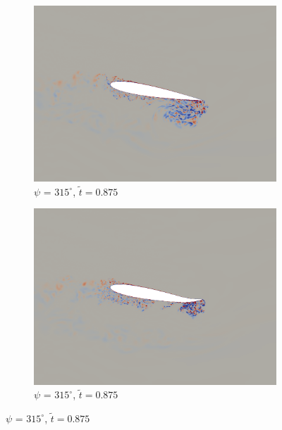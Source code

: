 \begin{figure}[H]
	\begin{subfigure}[b]{0.4\textwidth}
		\centering
		\includegraphics[width=1\textwidth]{figures/mu_1pt5/vorticity/baseline/phase_315.png}
		\caption{ $\psi$ = $315^\circ$, $\tilde{t}=0.875$}
		\label{fig:mu_1pt5_baseline_psi315}
	\end{subfigure}
	\begin{subfigure}[b]{0.4\textwidth}
		\centering
		\includegraphics[width=1\textwidth]{figures/mu_1pt5/vorticity/AC/phase_315.png}
		\caption{ $\psi$ = $315^\circ$, $\tilde{t}=0.875$}
		\label{fig:mu_1pt5_AC_psi315}
	\end{subfigure}
	

\end{figure}
